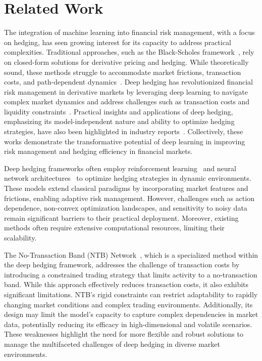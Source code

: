 \section{Related Work}
\label{related}
The integration of machine learning into financial risk management, with a focus on hedging, has seen growing interest for its capacity to address practical complexities.  Traditional approaches, such as the Black-Scholes framework~\citep{black1973pricing}, rely on closed-form solutions for derivative pricing and hedging. While theoretically sound, these methods struggle to accommodate market frictions, transaction costs, and path-dependent dynamics~\citep{shreve2005stochastic}. 
Deep hedging has revolutionized financial risk management in derivative markets by leveraging deep learning to navigate complex market dynamics and address challenges such as transaction costs and liquidity constraints~\citep{buehler2019deep}. Practical insights and applications of deep hedging, emphasizing its model-independent nature and ability to optimize hedging strategies, have also been highlighted in industry reports~\citep{gao2023deeper}\citep{neagu2024deep}. Collectively, these works demonstrate the transformative potential of deep learning in improving risk management and hedging efficiency in financial markets.

Deep hedging frameworks often employ reinforcement learning~\citep{cao2021deep} and neural network architectures~\citep{ruf2019neural} to optimize hedging strategies in dynamic environments. These models extend classical paradigms by incorporating market features and frictions, enabling adaptive risk management. However, challenges such as action dependence, non-convex optimization landscapes, and sensitivity to noisy data~\citep{karakida2019universal} remain significant barriers to their practical deployment. Moreover, existing methods often require extensive computational resources, limiting their scalability.


The No-Transaction Band (NTB) Network~\citep{imaki2021no}, which is a specialized method within the deep hedging framework, addresses the challenge of transaction costs by introducing a constrained trading strategy that limits activity to a no-transaction band. While this approach effectively reduces transaction costs, it also exhibits significant limitations. NTB's rigid constraints can restrict adaptability to rapidly changing market conditions and complex trading environments. Additionally, its design may limit the model's capacity to capture complex dependencies in market data, potentially reducing its efficacy in high-dimensional and volatile scenarios. These weaknesses highlight the need for more flexible and robust solutions to manage the multifaceted challenges of deep hedging in diverse market environments.



